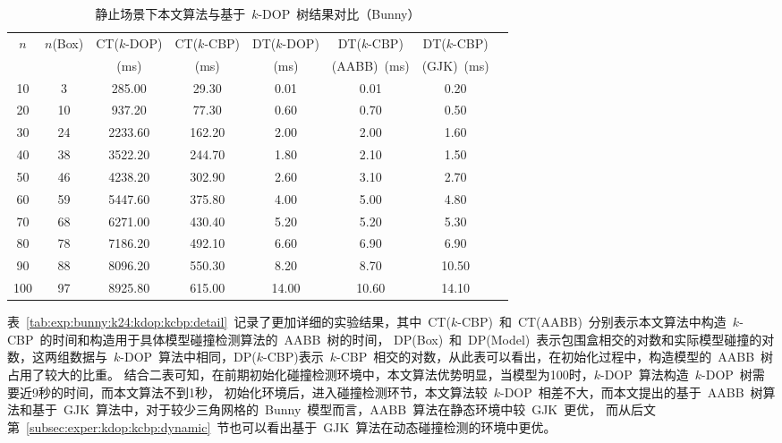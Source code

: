 \begin{table}[htbp]  
\centering
\caption{静止场景下本文算法与基于~$k$-DOP~树结果对比（Bunny）}
\label{tab:exp:bunny:k24:kdop:kcbp}
\begin{tabular}{cccccccc}
\toprule[1.5pt]
\multirow{2}{*}{$n$} & \multirow{2}{*}{$n$(Box)} & CT($k$-DOP) &  CT($k$-CBP) & DT($k$-DOP) & DT($k$-CBP) & DT($k$-CBP) \\%
                     &                         &  (ms)        & (ms)         & (ms)        & (AABB)~(ms) & (GJK)~(ms)       \\
\midrule[1.0pt]
10 & 3 &	285.00 &	29.30      &0.01 &	0.01  & 	0.20  \\ %
20 & 10&	937.20 &	77.30      &0.60 &	0.70  & 	0.50  \\ %
30 & 24&	2233.60&	162.20     &2.00 &	2.00  & 	1.60  \\ %
40 & 38&	3522.20&	244.70     &1.80 &	2.10  & 	1.50  \\ %
50 & 46&	4238.20&	302.90     &2.60 &	3.10  & 	2.70  \\ %
60 & 59&	5447.60&	375.80     &4.00 &	5.00  & 	4.80  \\ %
70 & 68&	6271.00&	430.40     &5.20 &	5.20  & 	5.30  \\ %
80 & 78&	7186.20&	492.10     &6.60 &	6.90  & 	6.90  \\ %
90 & 88&	8096.20&	550.30     &8.20 &	8.70  & 	10.50 \\ %
100& 97&	8925.80&	615.00     &14.00&	10.60 & 	14.10 \\ %
\bottomrule[1.5pt]
\end{tabular}
\end{table}

表~\ref{tab:exp:bunny:k24:kdop:kcbp:detail}~记录了更加详细的实验结果，其中~CT($k$-CBP)~和~CT(AABB)~分别表示本文算法中构造~$k$-CBP~的时间和构造用于具体模型碰撞检测算法的~AABB~树的时间，
DP(Box)~和~DP(Model)~表示包围盒相交的对数和实际模型碰撞的对数，这两组数据与~$k$-DOP~算法中相同，DP($k$-CBP)表示~$k$-CBP~相交的对数，从此表可以看出，在初始化过程中，构造模型的~AABB~树占用了较大的比重。
结合二表可知，在前期初始化碰撞检测环境中，本文算法优势明显，当模型为100时，$k$-DOP~算法构造~$k$-DOP~树需要近9秒的时间，而本文算法不到1秒，
初始化环境后，进入碰撞检测环节，本文算法较~$k$-DOP~相差不大，而本文提出的基于~AABB~树算法和基于~GJK~算法中，对于较少三角网格的~Bunny~模型而言，AABB~算法在静态环境中较~GJK~更优，
而从后文第~\ref{subsec:exper:kdop:kcbp:dynamic}~节也可以看出基于~GJK~算法在动态碰撞检测的环境中更优。 

